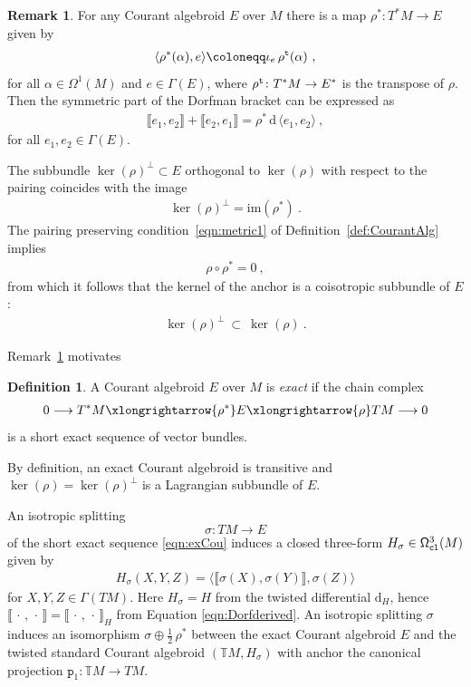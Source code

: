 \documentclass[a4paper, reqno, 11pt]{amsart}
\numberwithin{equation}{section}
\theoremstyle{definition}
\newtheorem{definition}[equation]{Definition}
\newtheorem{remark}[equation]{Remark}
\newcommand{\ip}[1]{\langle #1 \rangle}
\newcommand{\de}{\mathrm{d}}
\newcommand{\rmp}{\mathtt{p}}
\newcommand{\IT}{\mathbb{T}}
\renewcommand{\Im}{\ensuremath{\mathrm{im}}}
\newcommand{\sfGamma}{{\mathsf{\Gamma}}}
\theoremstyle{remark}
\begin{document}
\begin{remark}\label{rem:Courantcond}
For any Courant algebroid $E$ over $M$ there is a map $\rho^*\colon T^*M\to E$ given by
\begin{align}\label{eqn:rhostar}
\langle\rho^*(\alpha),e\rangle  \coloneqq \iota_e\, \rho^{\tt t}(\alpha) \ ,
\end{align}
for all $\alpha\in \mathsf{\Omega}^1(M)$ and $e\in\mathsf{\Gamma}(E)$, where $\rho^{\tt t}\colon T^*M\to E^*$ is the transpose of $\rho.$ Then the symmetric part of the Dorfman bracket can be expressed as
\begin{align}
    \llbracket e_1, e_2\rrbracket + \llbracket e_2, e_1\rrbracket = \rho^*\,\de \, \ip{e_1 , e_2} \ ,
\end{align}
for all $e_1,e_2\in\sfGamma(E)$.

The subbundle $\ker(\rho)^\perp\subset E$ orthogonal to $\ker(\rho)$ with respect to the pairing  coincides with the image
\begin{align}
    \ker(\rho)^\perp = \Im(\rho^*) \ .
\end{align}
The pairing preserving condition~\ref{eqn:metric1} of Definition~\ref{def:CourantAlg} implies
\begin{align}
    \rho\circ\rho^* = 0 \ , 
\end{align}
from which it follows that the kernel of the anchor is a coisotropic subbundle of $E$:
\begin{align}
    \ker(\rho)^\perp \ \subset \ \ker(\rho) \ .
\end{align}
\end{remark}

Remark~\ref{rem:Courantcond} motivates

\begin{definition}
A Courant algebroid $E$ over $M$ is \emph{exact} if the chain complex
\begin{align}\label{eqn:exCou}
0 \longrightarrow T^*M \xlongrightarrow{\rho^*} E \xlongrightarrow{\rho} TM \longrightarrow 0
\end{align}
is a short exact sequence of vector bundles.
\end{definition}

By definition, an exact Courant algebroid is transitive and $\ker(\rho)=\ker(\rho)^\perp$ is a Lagrangian subbundle of $E$.

An isotropic splitting $$\sigma\colon TM \longrightarrow E$$ of the short exact sequence \eqref{eqn:exCou} induces a closed three-form $H_\sigma \in \mathsf{\Omega}_{\tt cl}^3(M)$ given by
\begin{align}\label{eqn:severaclass}
    H_\sigma(X,Y,Z) =  \ip{\llbracket\sigma(X),\sigma(Y)\rrbracket, \sigma(Z)}
\end{align}
for $X,Y,Z \in \mathsf{\Gamma}(TM)$. Here $H_\sigma = H$ from the twisted differential $\de_H$, hence $\llbracket\,\cdot\,,\, \cdot\, \rrbracket = \llbracket\,\cdot\,,\, \cdot\, \rrbracket_H$ from Equation \eqref{eqn:Dorfderived}. An isotropic splitting $\sigma$ induces an isomorphism $\sigma \oplus \tfrac{1}{2}\,\rho^*$ between the exact Courant algebroid $E$ and the twisted standard Courant algebroid $(\IT M, H_\sigma)$ with anchor the canonical projection $\rmp_1:\IT M\to TM$.
\end{document}

